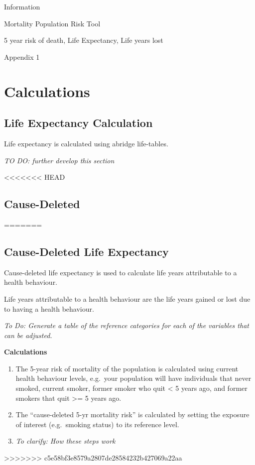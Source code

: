 \documentclass[]{book}
\begin{document}
Information

Mortality Population Risk Tool

5 year risk of death, Life Expectancy, Life years lost

Appendix 1

\section{Calculations}\label{calculations}

\subsection{Life Expectancy
Calculation}\label{life-expectancy-calculation}

Life expectancy is calculated using abridge life-tables.

\emph{TO DO: further develop this section}

<<<<<<< HEAD
\subsection{Cause-Deleted}\label{cause-deleted}
=======
\subsection{Cause-Deleted Life
Expectancy}\label{cause-deleted-life-expectancy-1}





Cause-deleted life expectancy is used to calculate life years
attributable to a health behaviour.

Life years attributable to a health behaviour are the life years gained
or lost due to having a health behaviour.

\emph{To Do: Generate a table of the reference categories for each of
the variables that can be adjusted.}

\textbf{Calculations}

\begin{enumerate}
\def\labelenumi{\arabic{enumi})}
\item
  The 5-year risk of mortality of the population is calculated using
  current health behaviour levels, e.g.~your population will have
  individuals that never smoked, current smoker, former smoker who quit
  \textless{} 5 years ago, and former smokers that quit \textgreater{}=
  5 years ago.
\item
  The ``cause-deleted 5-yr mortality risk'' is calculated by setting the
  exposure of interest (e.g.~smoking status) to its reference level.
\item
  \emph{To clarify: How these steps work}
\end{enumerate}
>>>>>>> c5e58bf3e8579a2807de28584232b427069a22aa
\end{document}
